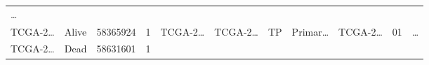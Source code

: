 \documentclass[
]{article}
\begin{document}
\begin{longtable}[]{@{}lllllllllll@{}}
\begin{minipage}[t]{0.03\columnwidth}
\ldots{}\strut
\end{minipage}\tabularnewline
\begin{minipage}[t]{0.07\columnwidth}\raggedright
TCGA-2\ldots{}\strut
\end{minipage} & \begin{minipage}[t]{0.04\columnwidth}\raggedright
Alive\strut
\end{minipage} & \begin{minipage}[t]{0.06\columnwidth}\raggedright
58365924\strut
\end{minipage} & \begin{minipage}[t]{0.07\columnwidth}\raggedright
1\strut
\end{minipage} & \begin{minipage}[t]{0.07\columnwidth}\raggedright
TCGA-2\ldots{}\strut
\end{minipage} & \begin{minipage}[t]{0.07\columnwidth}\raggedright
TCGA-2\ldots{}\strut
\end{minipage} & \begin{minipage}[t]{0.07\columnwidth}\raggedright
TP\strut
\end{minipage} & \begin{minipage}[t]{0.07\columnwidth}\raggedright
Primar\ldots{}\strut
\end{minipage} & \begin{minipage}[t]{0.09\columnwidth}\raggedright
TCGA-2\ldots{}\strut
\end{minipage} & \begin{minipage}[t]{0.10\columnwidth}\raggedright
01\strut
\end{minipage} & \begin{minipage}[t]{0.03\columnwidth}\raggedright
\ldots{}\strut
\end{minipage}\tabularnewline
\begin{minipage}[t]{0.07\columnwidth}\raggedright
TCGA-2\ldots{}\strut
\end{minipage} & \begin{minipage}[t]{0.04\columnwidth}\raggedright
Dead\strut
\end{minipage} & \begin{minipage}[t]{0.06\columnwidth}\raggedright
58631601\strut
\end{minipage} & \begin{minipage}[t]{0.07\columnwidth}\raggedright
1\strut
\end{minipage} & \begin{minipage}[t]{0.07\columnwidth}\raggedright

\end{minipage}
\end{longtable}
\end{document}
